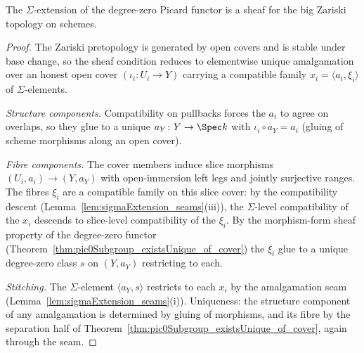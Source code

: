 \begin{theorem}
  \label{thm:pic0SigmaFunctor_isSheaf}
  \leanok
  The \(\Sigma\)-extension of the degree-zero Picard functor is a sheaf for the big Zariski
  topology on schemes.
\end{theorem}
\begin{proof}
  \leanok
  The Zariski pretopology is generated by open covers and is stable under base change, so
  the sheaf condition reduces to elementwise unique amalgamation over an honest open cover
  \((\iota_i \colon U_i \to Y)\) carrying a compatible family
  \(x_i = \langle a_i, \xi_i \rangle\) of \(\Sigma\)-elements.

  \emph{Structure components.} Compatibility on pullbacks forces the \(a_i\) to agree on
  overlaps, so they glue to a unique \(a_Y \colon Y \to \Spec k\) with
  \(\iota_i \circ a_Y = a_i\) (gluing of scheme morphisms along an open cover).

  \emph{Fibre components.} The cover members induce slice morphisms
  \((U_i, a_i) \to (Y, a_Y)\) with open-immersion left legs and jointly surjective ranges.
  The fibres \(\xi_i\) are a compatible family on this slice cover: by the compatibility
  descent (Lemma~\ref{lem:sigmaExtension_seams}(iii)), the \(\Sigma\)-level compatibility of
  the \(x_i\) descends to slice-level compatibility of the \(\xi_i\). By the morphism-form
  sheaf property of the degree-zero functor
  (Theorem~\ref{thm:pic0Subgroup_existsUnique_of_cover}) the \(\xi_i\) glue to a unique
  degree-zero class \(s\) on \((Y, a_Y)\) restricting to each.

  \emph{Stitching.} The \(\Sigma\)-element \(\langle a_Y, s\rangle\) restricts to each
  \(x_i\) by the amalgamation seam (Lemma~\ref{lem:sigmaExtension_seams}(i)). Uniqueness:
  the structure component of any amalgamation is determined by gluing of morphisms, and its
  fibre by the separation half of
  Theorem~\ref{thm:pic0Subgroup_existsUnique_of_cover}, again through the seam.
\end{proof}

